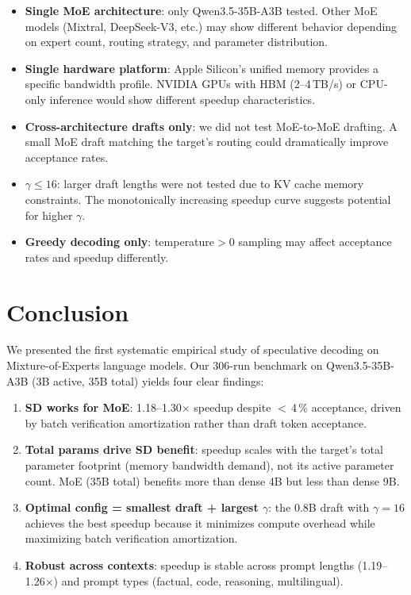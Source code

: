 \documentclass[11pt,a4paper]{article}
\begin{document}
\begin{itemize}[nosep,leftmargin=*]
  \item \textbf{Single MoE architecture}: only Qwen3.5-35B-A3B tested. Other MoE models (Mixtral, DeepSeek-V3, etc.) may show different behavior depending on expert count, routing strategy, and parameter distribution.
  \item \textbf{Single hardware platform}: Apple Silicon's unified memory provides a specific bandwidth profile. NVIDIA GPUs with HBM (2--4\,TB/s) or CPU-only inference would show different speedup characteristics.
  \item \textbf{Cross-architecture drafts only}: we did not test MoE-to-MoE drafting. A small MoE draft matching the target's routing could dramatically improve acceptance rates.
  \item \textbf{$\gamma \leq 16$}: larger draft lengths were not tested due to KV cache memory constraints. The monotonically increasing speedup curve suggests potential for higher $\gamma$.
  \item \textbf{Greedy decoding only}: temperature$>$0 sampling may affect acceptance rates and speedup differently.
\end{itemize}

\section{Conclusion}

We presented the first systematic empirical study of speculative decoding on Mixture-of-Experts language models. Our 306-run benchmark on Qwen3.5-35B-A3B (3B active, 35B total) yields four clear findings:

\begin{enumerate}[nosep,leftmargin=*]
  \item \textbf{SD works for MoE}: 1.18--1.30$\times$ speedup despite $<$\,4\,\% acceptance, driven by batch verification amortization rather than draft token acceptance.

  \item \textbf{Total params drive SD benefit}: speedup scales with the target's total parameter footprint (memory bandwidth demand), not its active parameter count. MoE (35B total) benefits more than dense 4B but less than dense 9B.

  \item \textbf{Optimal config = smallest draft + largest $\gamma$}: the 0.8B draft with $\gamma=16$ achieves the best speedup because it minimizes compute overhead while maximizing batch verification amortization.

  \item \textbf{Robust across contexts}: speedup is stable across prompt lengths (1.19--1.26$\times$) and prompt types (factual, code, reasoning, multilingual).
\end{enumerate}
\end{document}
